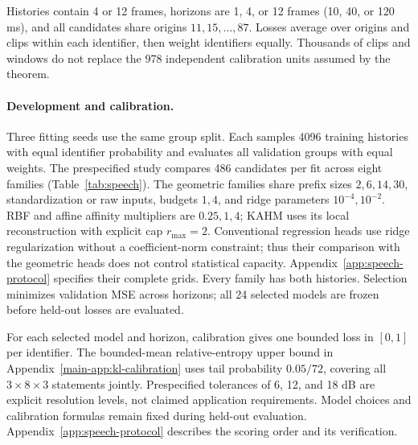 Histories contain 4 or 12 frames, horizons are 1, 4, or 12 frames
(10, 40, or 120 ms), and all candidates share origins $11,15,\ldots,87$.
Losses average over origins and clips within each identifier, then weight
identifiers equally. Thousands of clips and windows do not replace the
978 independent calibration units assumed by the theorem.

\paragraph{Development and calibration.}
Three fitting seeds use the same group split. Each samples 4096 training
histories with equal identifier probability and evaluates all validation
groups with equal weights. The prespecified study compares 486 candidates per
fit across eight
families (Table~\ref{tab:speech}). The geometric families share prefix sizes
$2,6,14,30$, standardization or raw inputs, budgets $1,4$, and ridge parameters
$10^{-4},10^{-2}$. RBF and affine affinity multipliers are $0.25,1,4$;
KAHM uses its local reconstruction with explicit cap $r_{\max}=2$.
Conventional regression heads use
ridge regularization without a coefficient-norm constraint; thus their
comparison with the geometric heads does not control statistical capacity.
Appendix~\ref{app:speech-protocol} specifies their complete grids. Every family
has both histories. Selection
minimizes validation MSE across horizons; all 24 selected models are frozen
before held-out losses are evaluated.

For each selected model and horizon, calibration gives one bounded loss in
$[0,1]$ per identifier. The bounded-mean relative-entropy upper bound in
Appendix~\ref{main-app:kl-calibration} uses tail probability $0.05/72$, covering
all $3\times8\times3$ statements jointly. Prespecified tolerances of
6, 12, and 18 dB are explicit resolution levels, not claimed application
requirements. Model choices and calibration formulas remain fixed during
held-out evaluation. Appendix~\ref{app:speech-protocol} describes the scoring
order and its verification.

